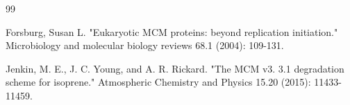 \newpage
\clearpage
\label{MyLastPage}

\makeatletter
\renewcommand\@biblabel[1]{[\makebox[1em][c]{#1}]}
\makeatother

\begin{thebibliography}{99}%
	
	\setlength{\itemsep}{3mm}



Forsburg, Susan L. "Eukaryotic MCM proteins: beyond replication initiation." Microbiology and molecular biology reviews 68.1 (2004): 109-131.


Jenkin, M. E., J. C. Young, and A. R. Rickard. "The MCM v3. 3.1 degradation scheme for isoprene." Atmospheric Chemistry and Physics 15.20 (2015): 11433-11459.

















	
	

\end{thebibliography}
